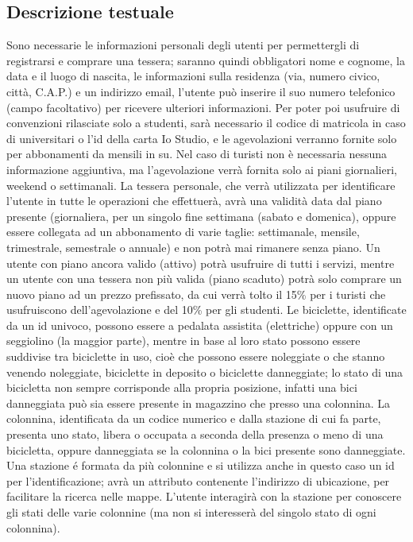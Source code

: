 \documentclass[a4paper,twoside]{article}
\begin{document}
\subsection{Descrizione testuale}
Sono necessarie le informazioni personali degli utenti per permettergli di registrarsi e comprare una tessera; saranno quindi obbligatori nome e cognome, la data e il luogo di nascita, le informazioni sulla residenza (via, numero civico, città, C.A.P.) e un indirizzo email, l'utente può inserire il suo numero telefonico (campo facoltativo) per ricevere ulteriori informazioni.\newline
Per poter poi usufruire di convenzioni rilasciate solo a studenti, sarà necessario il codice di matricola in caso di universitari o l'id della carta Io Studio, e le agevolazioni verranno fornite solo per abbonamenti da mensili in su.\newline
Nel caso di turisti non è necessaria nessuna informazione aggiuntiva, ma l'agevolazione verrà fornita solo ai piani giornalieri, weekend o settimanali.\newline
La tessera personale, che verrà utilizzata per identificare l'utente in tutte le operazioni che effettuerà, avrà una validità data dal piano presente (giornaliera, per un singolo fine settimana (sabato e domenica), oppure essere collegata ad un abbonamento di varie taglie: settimanale, mensile, trimestrale, semestrale o annuale) e non potrà mai rimanere senza piano. Un utente con piano ancora valido (attivo) potrà usufruire di tutti i servizi, mentre un utente con una tessera non più valida (piano scaduto) potrà solo comprare un nuovo piano ad un prezzo prefissato, da cui verrà tolto il 15\% per i turisti che usufruiscono dell'agevolazione e del 10\% per gli studenti.\newline
Le biciclette, identificate da un id univoco, possono essere a pedalata assistita (elettriche) oppure con un seggiolino (la maggior parte), mentre in base al loro stato possono essere suddivise tra biciclette in uso, cioè che possono essere noleggiate o che stanno venendo noleggiate, biciclette in deposito o biciclette danneggiate; lo stato di una bicicletta non sempre corrisponde alla propria posizione, infatti una bici danneggiata può sia essere presente in magazzino che presso una colonnina.\newline
La  colonnina, identificata da un codice numerico e dalla stazione di cui fa parte, presenta uno stato,  libera o occupata a seconda della presenza o meno di una bicicletta, oppure danneggiata se la colonnina o la bici presente sono danneggiate.\newline
Una stazione é formata da più colonnine e si utilizza anche in questo caso un id per l'identificazione; avrà un attributo contenente l'indirizzo di ubicazione, per facilitare la ricerca nelle mappe. L'utente interagirà con la stazione per conoscere gli stati delle varie colonnine (ma non si interesserà del singolo stato di ogni colonnina).
\end{document}
